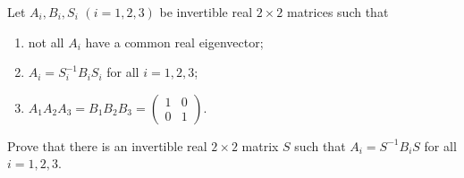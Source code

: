 \documentclass{article}
\begin{document}
\setlength{\parindent}{0pt}
Let $A_{i},B_{i},S_{i}$ $(i=1,2,3)$ be invertible real $2\times2$ matrices such that
\begin{enumerate}[label=(\arabic*)]
\item not all $A_{i}$ have a common real eigenvector;
\item $A_{i}=S_{i}^{-1}B_{i}S_{i}$ for all $i=1,2,3$;
\item $A_{1}A_{2}A_{3}=B_{1}B_{2}B_{3}=\begin{pmatrix}1&0\\0&1\end{pmatrix}$.
\end{enumerate}
Prove that there is an invertible real $2\times2$ matrix $S$ such that $A_{i}=S^{-1}B_{i}S$ for all $i=1,2,3$.
\end{document}
